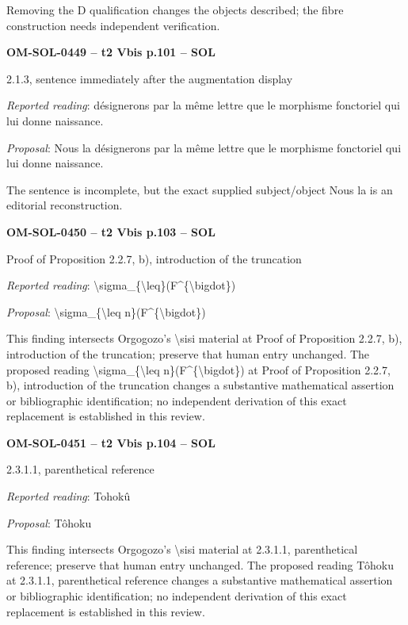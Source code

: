 Removing the D qualification changes the objects described; the fibre construction needs independent verification.\par
\par\noindent\textbf{OM-SOL-0449 -- t2 Vbis p.101 -- SOL}\par
2.1.3, sentence immediately after the augmentation display\par
\emph{Reported reading}: désignerons par la même lettre que le morphisme fonctoriel qui lui donne naissance.\par
\emph{Proposal}: Nous la désignerons par la même lettre que le morphisme fonctoriel qui lui donne naissance.\par
The sentence is incomplete, but the exact supplied subject/object Nous la is an editorial reconstruction.\par
\par\noindent\textbf{OM-SOL-0450 -- t2 Vbis p.103 -- SOL}\par
Proof of Proposition 2.2.7, b), introduction of the truncation\par
\emph{Reported reading}: \textbackslash{}sigma\_\{\textbackslash{}leq\}(F\textasciicircum{}\{\textbackslash{}bigdot\})\par
\emph{Proposal}: \textbackslash{}sigma\_\{\textbackslash{}leq n\}(F\textasciicircum{}\{\textbackslash{}bigdot\})\par
This finding intersects Orgogozo's \textbackslash{}sisi material at Proof of Proposition 2.2.7, b), introduction of the truncation; preserve that human entry unchanged. The proposed reading \textbackslash{}sigma\_\{\textbackslash{}leq n\}(F\textasciicircum{}\{\textbackslash{}bigdot\}) at Proof of Proposition 2.2.7, b), introduction of the truncation changes a substantive mathematical assertion or bibliographic identification; no independent derivation of this exact replacement is established in this review.\par
\par\noindent\textbf{OM-SOL-0451 -- t2 Vbis p.104 -- SOL}\par
2.3.1.1, parenthetical reference\par
\emph{Reported reading}: Tohokû\par
\emph{Proposal}: Tôhoku\par
This finding intersects Orgogozo's \textbackslash{}sisi material at 2.3.1.1, parenthetical reference; preserve that human entry unchanged. The proposed reading Tôhoku at 2.3.1.1, parenthetical reference changes a substantive mathematical assertion or bibliographic identification; no independent derivation of this exact replacement is established in this review.\par
